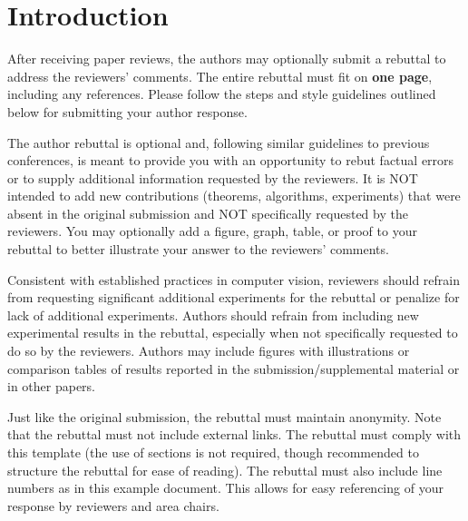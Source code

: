 \documentclass[10pt,twocolumn,letterpaper]{article}
\begin{document}

\thispagestyle{empty}
\appendix


\section{Introduction}

After receiving paper reviews, the authors may optionally submit a rebuttal to address the reviewers' comments. The entire rebuttal must fit on \textbf{one page}, including any references. Please follow the steps and style guidelines outlined below for submitting your author response.

The author rebuttal is optional and, following similar guidelines to previous conferences, is meant to provide you with an opportunity to rebut factual errors or to supply additional information requested by the reviewers.
It is NOT intended to add new contributions (theorems, algorithms, experiments) that were absent in the original submission and NOT specifically requested by the reviewers.
You may optionally add a figure, graph, table, or proof to your rebuttal to better illustrate your answer to the reviewers' comments.

Consistent with established practices in computer vision, reviewers should refrain from requesting significant additional experiments for the rebuttal or penalize for lack of additional experiments.
Authors should refrain from including new experimental results in the rebuttal, especially when not specifically requested to do so by the reviewers.
Authors may include figures with illustrations or comparison tables of results reported in the submission/supplemental material or in other papers.

Just like the original submission, the rebuttal must maintain anonymity.
Note that the rebuttal must not include external links.
The rebuttal must comply with this template (the use of sections is not required, though recommended to structure the rebuttal for ease of reading).
The rebuttal must also include line numbers as in this example document.
This allows for easy referencing of your response by reviewers and area chairs.
\end{document}
